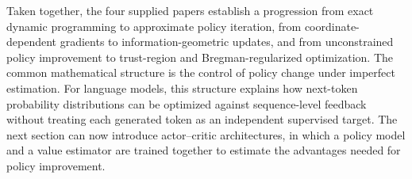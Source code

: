Taken together, the four supplied papers establish a progression from exact
dynamic programming to approximate policy iteration, from coordinate-dependent
gradients to information-geometric updates, and from unconstrained policy
improvement to trust-region and Bregman-regularized optimization. The common
mathematical structure is the control of policy change under imperfect
estimation. For language models, this structure explains how next-token
probability distributions can be optimized against sequence-level feedback
without treating each generated token as an independent supervised target.
The next section can now introduce actor--critic architectures, in which a
policy model and a value estimator are trained together to estimate the
advantages needed for policy improvement.
